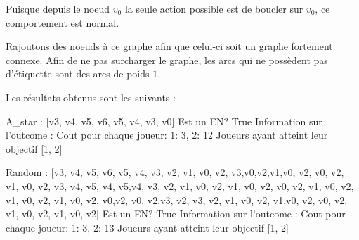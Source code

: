 Puisque depuis le noeud $v_0$ la seule action possible est de boucler sur $v_0$, ce comportement est normal. 

Rajoutons des noeuds à ce graphe afin que celui-ci soit un graphe fortement connexe. Afin de ne pas surcharger le graphe, les arcs qui ne possèdent pas d'étiquette sont des arcs de poids $1$.

\begin{figure}[ht!]
	\centering

\end{figure}
\FloatBarrier

Les résultats obtenus sont les suivants  :

\begin{code}

A_star : [v3, v4, v5, v6, v5, v4, v3, v0]
Est un EN?  True
Information sur l'outcome : 
Cout pour chaque joueur:  {1: 3, 2: 12}
Joueurs ayant atteint leur objectif  [1, 2]

Random :  [v3, v4, v5, v6, v5, v4, v3, v2, v1, v0,
v2, v3,v0,v2,v1,v0, v2, v0, v2, v1, v0, v2, v3, v4,
v5, v4, v5,v4, v3, v2, v1, v0, v2, v1, v0, v2, v0,
v2, v1, v0, v2, v1, v0, v2, v1, v0, v2, v0,v2, v0,
v2,v3, v2, v3, v2, v1, v0, v2, v1,v0, v2, v0, v2,
v1, v0, v2, v1, v0, v2]
Est un EN?  True
Information sur l'outcome :
Cout pour chaque joueur:  {1: 3, 2: 13}
Joueurs ayant atteint leur objectif  [1, 2]

\end{code}

